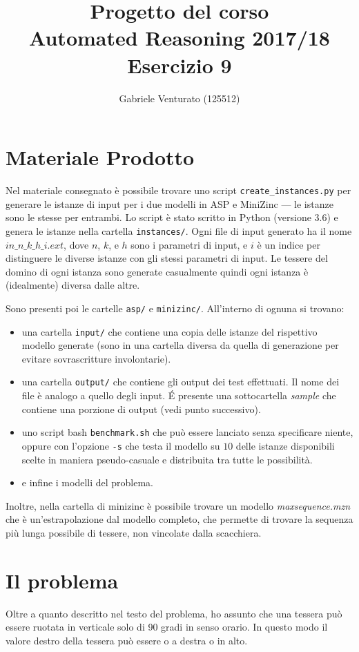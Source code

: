 \documentclass[12pt,a4paper,english,italian]{article}
\title{Progetto del corso \\Automated Reasoning 2017/18\\Esercizio 9}
\author{Gabriele Venturato (125512)}
\begin{document}
\maketitle

\section{Materiale Prodotto}
Nel materiale consegnato è possibile trovare uno script \texttt{create\_instances.py} per generare le istanze di input per i due modelli in ASP e MiniZinc --- le istanze sono le stesse per entrambi. Lo script è stato scritto in Python (versione 3.6) e genera le istanze nella cartella \texttt{instances/}. Ogni file di input generato ha il nome $in\_n\_k\_h\_i.ext$, dove $n$, $k$, e $h$ sono i parametri di input, e $i$ è un indice per distinguere le diverse istanze con gli stessi parametri di input. Le tessere del domino di ogni istanza sono generate casualmente quindi ogni istanza è (idealmente) diversa dalle altre.

Sono presenti poi le cartelle \texttt{asp/} e \texttt{minizinc/}. All'interno di ognuna si trovano:
\begin{itemize}
	\item una cartella \texttt{input/} che contiene una copia delle istanze del rispettivo modello generate (sono in una cartella diversa da quella di generazione per evitare sovrascritture involontarie).
	\item una cartella \texttt{output/} che contiene gli output dei test effettuati. Il nome dei file è analogo a quello degli input. \'E presente una sottocartella \emph{sample} che contiene una porzione di output (vedi punto successivo).
	\item uno script bash \texttt{benchmark.sh} che può essere lanciato senza specificare niente, oppure con l'opzione \texttt{-s} che testa il modello su $10$ delle istanze disponibili scelte in maniera pseudo-casuale e distribuita tra tutte le possibilità.
	\item e infine i modelli del problema.
\end{itemize}

Inoltre, nella cartella di minizinc è possibile trovare un modello \emph{maxsequence.mzn} che è un'estrapolazione dal modello completo, che permette di trovare la sequenza più lunga possibile di tessere, non vincolate dalla scacchiera.

\section{Il problema}
Oltre a quanto descritto nel testo del problema, ho assunto che una tessera può essere ruotata in verticale solo di 90 gradi in senso orario. In questo modo il valore destro della tessera può essere o a destra o in alto.
\end{document}
